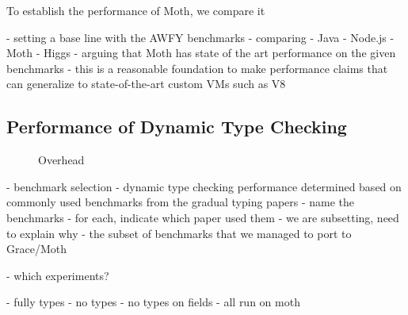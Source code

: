 To establish the performance of Moth,
we compare it 
\citep{Marr2016}

\begin{cnote}
- setting a base line with the AWFY benchmarks
- comparing
  - Java
  - Node.js
  - Moth
  - Higgs
- arguing that Moth has state of the art performance on the given benchmarks
- this is a reasonable foundation to make performance claims
  that can generalize to state-of-the-art custom VMs such as V8
\end{cnote}

\subsection{Performance of Dynamic Type Checking}

\begin{figure}
	\TypingOverhead{}
	\caption{Overhead}
	\label{fig:typing-overhead}
\end{figure}

\begin{cnote}
- benchmark selection
 - dynamic type checking performance determined based on commonly used
   benchmarks from the gradual typing papers
   - name the benchmarks
   - for each, indicate which paper used them
   - we are subsetting, need to explain why
     - the subset of benchmarks that we managed to port to Grace/Moth


  - which experiments?
  
  - fully types
  - no types
  - no types on fields
  - all run on moth

\end{cnote}

